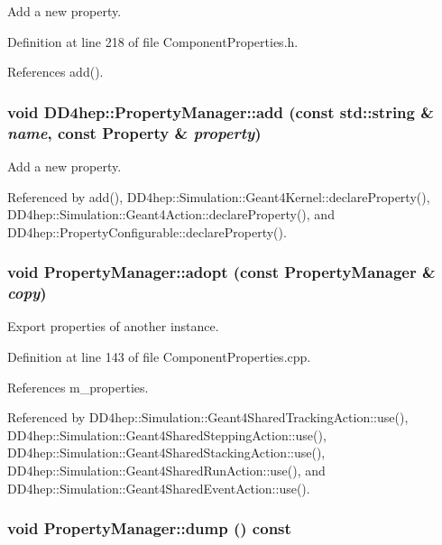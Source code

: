 Add a new property. 

Definition at line 218 of file ComponentProperties.h.

References add().\hypertarget{class_d_d4hep_1_1_property_manager_a616e3114076118659daddb1dc826a3ed}{
\subsubsection[{add}]{\setlength{\rightskip}{0pt plus 5cm}void DD4hep::PropertyManager::add (const std::string \& {\em name}, \/  const {\bf Property} \& {\em property})}}
\label{class_d_d4hep_1_1_property_manager_a616e3114076118659daddb1dc826a3ed}


Add a new property. 

Referenced by add(), DD4hep::Simulation::Geant4Kernel::declareProperty(), DD4hep::Simulation::Geant4Action::declareProperty(), and DD4hep::PropertyConfigurable::declareProperty().\hypertarget{class_d_d4hep_1_1_property_manager_aaf21d1b86b833d99d004a77db1872141}{
\subsubsection[{adopt}]{\setlength{\rightskip}{0pt plus 5cm}void PropertyManager::adopt (const {\bf PropertyManager} \& {\em copy})}}
\label{class_d_d4hep_1_1_property_manager_aaf21d1b86b833d99d004a77db1872141}


Export properties of another instance. 

Definition at line 143 of file ComponentProperties.cpp.

References m\_\-properties.

Referenced by DD4hep::Simulation::Geant4SharedTrackingAction::use(), DD4hep::Simulation::Geant4SharedSteppingAction::use(), DD4hep::Simulation::Geant4SharedStackingAction::use(), DD4hep::Simulation::Geant4SharedRunAction::use(), and DD4hep::Simulation::Geant4SharedEventAction::use().\hypertarget{class_d_d4hep_1_1_property_manager_a21f6decfbdbca30f65fa4ebae6da5468}{
\subsubsection[{dump}]{\setlength{\rightskip}{0pt plus 5cm}void PropertyManager::dump () const}}
\label{class_d_d4hep_1_1_property_manager_a21f6decfbdbca30f65fa4ebae6da5468}


